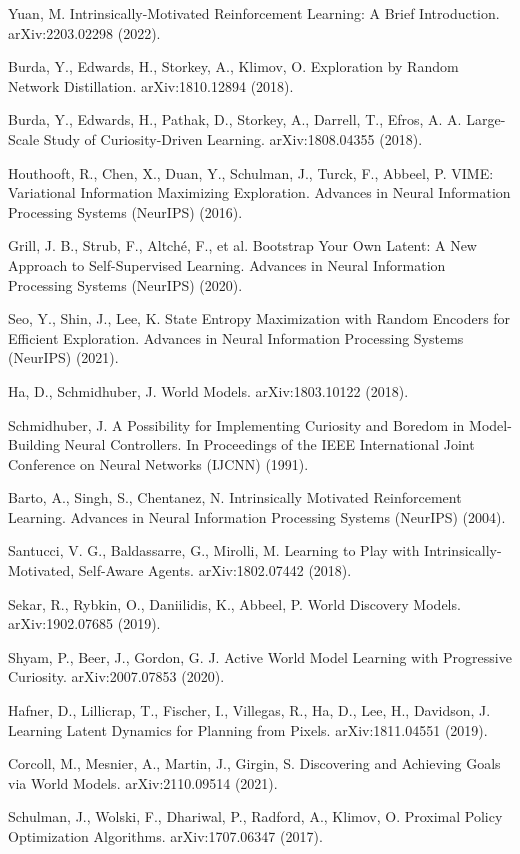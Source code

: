 \begin{thebibliography}{99}
   Yuan, M.
   Intrinsically-Motivated Reinforcement Learning: A Brief Introduction.
   arXiv:2203.02298 (2022).

   Burda, Y., Edwards, H., Storkey, A., Klimov, O.
   Exploration by Random Network Distillation.
   arXiv:1810.12894 (2018).

   Burda, Y., Edwards, H., Pathak, D., Storkey, A., Darrell, T., Efros, A. A.
   Large-Scale Study of Curiosity-Driven Learning.
   arXiv:1808.04355 (2018).

   Houthooft, R., Chen, X., Duan, Y., Schulman, J., Turck, F., Abbeel, P.
   VIME: Variational Information Maximizing Exploration.
   Advances in Neural Information Processing Systems (NeurIPS) (2016).

   Grill, J. B., Strub, F., Altché, F., et al.
   Bootstrap Your Own Latent: A New Approach to Self-Supervised Learning.
   Advances in Neural Information Processing Systems (NeurIPS) (2020).

   Seo, Y., Shin, J., Lee, K.
   State Entropy Maximization with Random Encoders for Efficient Exploration.
   Advances in Neural Information Processing Systems (NeurIPS) (2021).

   Ha, D., Schmidhuber, J.
   World Models.
   arXiv:1803.10122 (2018).

   Schmidhuber, J.
   A Possibility for Implementing Curiosity and Boredom in Model-Building Neural Controllers.
   In Proceedings of the IEEE International Joint Conference on Neural Networks (IJCNN) (1991).

   Barto, A., Singh, S., Chentanez, N.
   Intrinsically Motivated Reinforcement Learning.
   Advances in Neural Information Processing Systems (NeurIPS) (2004).

   Santucci, V. G., Baldassarre, G., Mirolli, M.
   Learning to Play with Intrinsically-Motivated, Self-Aware Agents.
   arXiv:1802.07442 (2018).

   Sekar, R., Rybkin, O., Daniilidis, K., Abbeel, P.
   World Discovery Models.
   arXiv:1902.07685 (2019).

   Shyam, P., Beer, J., Gordon, G. J.
   Active World Model Learning with Progressive Curiosity.
   arXiv:2007.07853 (2020).

   Hafner, D., Lillicrap, T., Fischer, I., Villegas, R., Ha, D., Lee, H., Davidson, J.
   Learning Latent Dynamics for Planning from Pixels.
   arXiv:1811.04551 (2019).

   Corcoll, M., Mesnier, A., Martin, J., Girgin, S.
   Discovering and Achieving Goals via World Models.
   arXiv:2110.09514 (2021).

   Schulman, J., Wolski, F., Dhariwal, P., Radford, A., Klimov, O.
   Proximal Policy Optimization Algorithms.
   arXiv:1707.06347 (2017).

\end{thebibliography}
